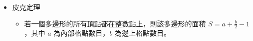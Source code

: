 \begin{itemize}
\item 皮克定理

\begin{itemize}
\item 若一個多邊形的所有頂點都在整數點上，則該多邊形的面積 $S = a + \frac{b}{2} - 1$，其中 $a$ 為內部格點數目，$b$ 為邊上格點數目。
\end{itemize}

\end{itemize}